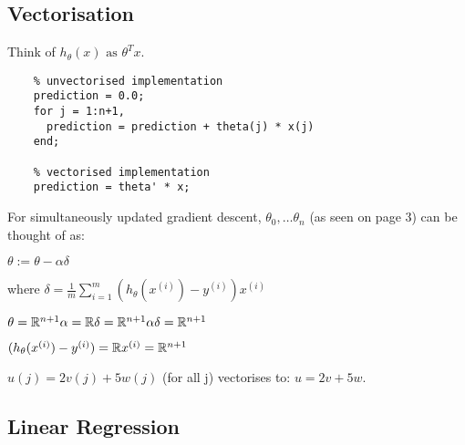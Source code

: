 \documentclass[12pt, a4paper]{article}
\begin{document}
  \subsection{Vectorisation}

    Think of $h_\theta(x) \text{ as } \theta^Tx$.

    \begin{lstlisting}
    % unvectorised implementation
    prediction = 0.0;
    for j = 1:n+1,
      prediction = prediction + theta(j) * x(j)
    end;

    % vectorised implementation
    prediction = theta' * x;
    \end{lstlisting}
    
    For simultaneously updated gradient descent, $\theta_0, \dots \theta_n$
    (as seen on page 3) can be thought of as:

    $\theta := \theta - \alpha\delta$
    
    where $\delta = \frac{1}{m} \displaystyle \sum_{i=1}^m 
    (h_\theta(x^{(i)}) - y^{(i)}) x^{(i)}$

    $\theta = \mathbb{R}^{n+1} \newline \alpha = \mathbb{R}
    \newline \delta = \mathbb{R}^{n+1} 
    \newline \alpha\delta = \mathbb{R}^{n+1}$

    $(h_\theta(x^{(i)}) - y^{(i)}) = \mathbb{R} \newline
    x^{(i)} = \mathbb{R}^{n+1}$

    $u(j) = 2v(j) + 5w(j)$ (for all j)
    vectorises to: $u = 2v + 5w$.

  \newpage
  
  \subsection{Linear Regression}
  
\end{document}
